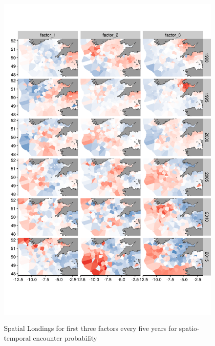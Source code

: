 \documentclass[12pt]{article}
\begin{document}
\begin{linenumbers}
\begin{figure}
\begin{center}
	\includegraphics[width = 0.75\linewidth]{"../figures/Suppl - SpatioTempLoadingsEpsilon1"}
	\label{fig:S5}
	\caption{Spatial Loadings for first three factors every five years for
	spatio-temporal encounter probability}
	\end{center}
\end{figure}


\end{linenumbers}
\end{document}
